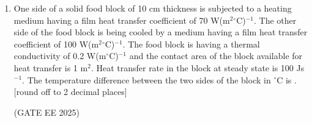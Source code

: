 \documentclass[journal,12pt,onecolumn]{IEEEtran}
\theoremstyle{remark}
\begin{document}
\begin{enumerate}
\item One side of a solid food block of 10 cm thickness is subjected to a heating medium having a film heat transfer coefficient of 70 W(m$^2$$^\circ$C)$^{-1}$. The other side of the food block is being cooled by a medium having a film heat transfer coefficient of 100 W(m$^2$$^\circ$C)$^{-1}$. The food block is having a thermal conductivity of 0.2 W(m$^\circ$C)$^{-1}$ and the contact area of the block available for heat transfer is 1 m$^2$. Heat transfer rate in the block at steady state is 100 Js$^{-1}$. The temperature difference between the two sides of the block in $^\circ$C is \underline{\hspace{2cm}}.{[round off to 2 decimal places]}

\hfill(GATE EE 2025)

\end{enumerate}
\end{document}
